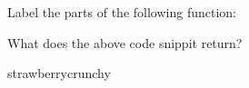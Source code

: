 \documentclass{article}
\begin{document}
\maketitle

\begin{subq}
 \subqs Label the parts of the following function: 
 
  \bigskip
 
\begin{solution}


 \end{solution}
 \subqs What does the above code snippit return? 
 \begin{solution}
 strawberrycrunchy
 \end{solution}
\end{subq}
\newpage
\end{document}
